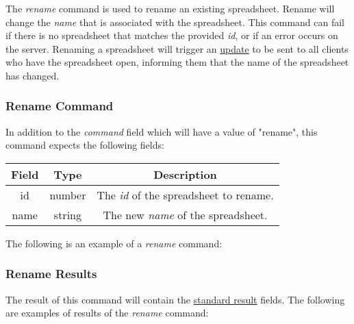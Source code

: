 The \emph{rename} command is used to rename an existing spreadsheet. Rename will 
change the \emph{name} that is associated with the spreadsheet. This command 
can fail if there is no spreadsheet that matches the provided \emph{id}, or 
if an error occurs on the server. Renaming a spreadsheet will trigger an 
\hyperref[lst:update:rename]{update} to be sent to all clients who have the 
spreadsheet open, informing them that the name of the spreadsheet has changed.

\subsubsection{Rename Command}
In addition to the \emph{command} field which will have a value of "rename", this command expects the following fields:

\begin{table}[H]
    \begin{center}
        \begin{tabular}{|c|c|c|}\hline
            Field & Type & Description \\\hline
            id & number & The \emph{id} of the spreadsheet to rename. \\\hline
            name & string & The new \emph{name} of the spreadsheet. \\\hline
        \end{tabular}
    \end{center}
\end{table}

The following is an example of a \emph{rename} command:


\subsubsection{Rename Results}
The result of this command will contain the \hyperref[sec:message:result]{standard result} fields.
The following are examples of results of the \emph{rename} command:





